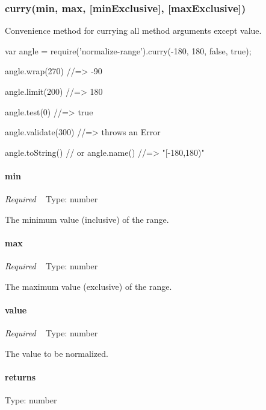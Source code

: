 \subsubsection*{curry(min, max, \mbox{[}min\+Exclusive\mbox{]}, \mbox{[}max\+Exclusive\mbox{]})}

Convenience method for currying all method arguments except {\ttfamily value}.


\begin{DoxyCode}
var angle = require('normalize-range').curry(-180, 180, false, true);

angle.wrap(270)
//=> -90

angle.limit(200)
//=> 180

angle.test(0)
//=> true

angle.validate(300)
//=> throws an Error

angle.toString() // or angle.name()
//=> "[-180,180)"
\end{DoxyCode}


\paragraph*{min}

{\itshape Required} ~\newline
Type\+: {\ttfamily number}

The minimum value (inclusive) of the range.

\paragraph*{max}

{\itshape Required} ~\newline
Type\+: {\ttfamily number}

The maximum value (exclusive) of the range.

\paragraph*{value}

{\itshape Required} ~\newline
Type\+: {\ttfamily number}

The value to be normalized.

\paragraph*{returns}

Type\+: {\ttfamily number}


